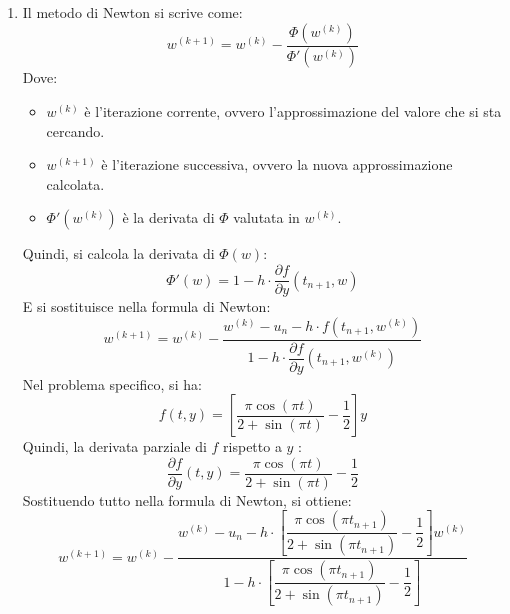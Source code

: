 \begin{enumerate}
\begin{enumerate}
        \item Il metodo di Newton si scrive come:
        \begin{equation*}
            w^{\left(k+1\right)} = w^{\left(k\right)} - \dfrac{\Phi\left(w^{\left(k\right)}\right)}{\Phi'\left(w^{\left(k\right)}\right)}
        \end{equation*}
        Dove:
        \begin{itemize}
            \item $w^{(k)}$ è l'iterazione corrente, ovvero l'approssimazione del valore che si sta cercando.
            \item $w^{(k+1)}$ è l'iterazione successiva, ovvero la nuova approssimazione calcolata.
            \item $\Phi'(w^{(k)})$ è la derivata di $\Phi$ valutata in $w^{(k)}$.
        \end{itemize}
        Quindi, si calcola la derivata di $\Phi(w)$:
        \begin{equation*}
            \Phi'(w) = 1 - h \cdot \dfrac{\partial f}{\partial y}(t_{n+1}, w)
        \end{equation*}
        E si sostituisce nella formula di Newton:
        \begin{equation*}
            w^{\left(k+1\right)} = w^{\left(k\right)} - \dfrac{w^{\left(k\right)} - u_{n} - h \cdot f\left(t_{n+1}, w^{\left(k\right)}\right)}{1 - h \cdot \dfrac{\partial f}{\partial y}(t_{n+1}, w^{\left(k\right)})}
        \end{equation*}
        Nel problema specifico, si ha:
        \begin{equation*}
            f(t, y) = \left[\dfrac{\pi \cos\left(\pi t\right)}{2 + \sin\left(\pi t\right)} - \dfrac{1}{2}\right] y
        \end{equation*}
        Quindi, la derivata parziale di $f$ rispetto a $y$ \eaccent:
        \begin{equation*}
            \dfrac{\partial f}{\partial y}(t, y) = \dfrac{\pi \cos\left(\pi t\right)}{2 + \sin\left(\pi t\right)} - \dfrac{1}{2}
        \end{equation*}
        Sostituendo tutto nella formula di Newton, si ottiene:
        \begin{equation*}
            w^{\left(k+1\right)} = w^{\left(k\right)} - \dfrac{w^{\left(k\right)} - u_{n} - h \cdot \left[\dfrac{\pi \cos\left(\pi t_{n+1}\right)}{2 + \sin\left(\pi t_{n+1}\right)} - \dfrac{1}{2}\right] w^{\left(k\right)}}{1 - h \cdot \left[\dfrac{\pi \cos\left(\pi t_{n+1}\right)}{2 + \sin\left(\pi t_{n+1}\right)} - \dfrac{1}{2}\right]}

\end{equation*}
\end{enumerate}
\end{enumerate}
